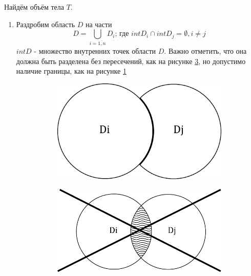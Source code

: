 \documentclass[a4paper, 14pt]{report}
\theoremstyle{definition}
\begin{document}
			Найдём объём тела $T$.
			\begin{enumerate}
				\item Раздробим область $D$ на части
					\begin{equation}
						D=\bigcup_{i=\overline{1,n}}D_i\text{; где }intD_i\cap intD_j=\emptyset, i\ne j
					\end{equation}
					$intD$ - множество внутренних точек области $D$. Важно отметить, что она должна быть разделена без пересечений, как на рисунке \ref{fig:area_d_intersect}, но допустимо наличие границы, как на рисунке \ref{fig:area_d_no_intersect}
					\begin{figure}[!ht]					
						\begin{subfigure}{0.40\linewidth}
							\centering
							\includegraphics[width=1\linewidth]{area_d_no_intersect}
							\caption{}
							\label{fig:area_d_no_intersect}
						\end{subfigure}
						\hfill
						\begin{subfigure}{0.5\linewidth}
							\centering
							\includegraphics[width=1\linewidth]{area_d_intersect}
							\caption{}
							\label{fig:area_d_intersect}
						\end{subfigure}
					\caption{}
					\end{figure}
			

\end{enumerate}
\end{document}
